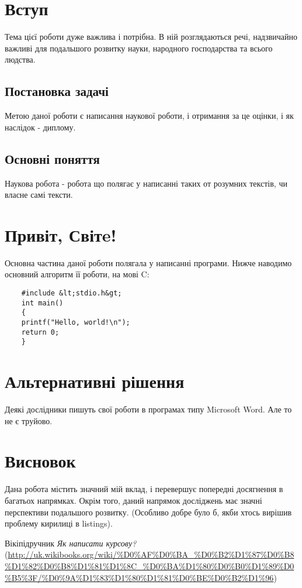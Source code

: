 \documentclass[a4paper,14pt]{extreport}
\begin{document}
	\tableofcontents
	\newpage
	
	\chapter{Вступ} 
	Тема цієї роботи дуже важлива і потрібна. В ній розглядаються речі, надзвичайно
	важливі для подальшого розвитку науки, народного господарства та всього людства.

	\section{Постановка задачі} 
	Метою даної роботи є написання наукової роботи, і отримання за це оцінки, і як
	наслідок - диплому.
	
	\section{Основні поняття}
	Наукова робота - робота що полягає у написанні таких от розумних текстів, чи власне самі тексти.
	
	\chapter{Привіт, Світe!} 
	Основна частина даної роботи полягала у написанні програми. Нижче наводимо основний алгоритм її роботи, на мові C:
	
	\begin{lstlisting}
	#include &lt;stdio.h&gt;
	int main() 
	{ 
	printf("Hello, world!\n"); 
	return 0; 
	} 
	\end{lstlisting}


	\chapter{Альтернативні рішення} 
	Деякі дослідники пишуть свої роботи в програмах типу Microsoft Word. Але то не є труйово\cite{howto}.
	
	\chapter{Висновок} 
	Дана робота містить значний мій вклад, і перевершує попередні досягнення в багатьох напрямках. Окрім того, даний напрямок досліджень має значні перспективи
	подальшого розвитку. (Особливо добре було б, якби хтось вирішив проблему кирилиці в listings).
	
	\newpage
	\begin{thebibliography}{9}
		
		 Вікіпідручник \emph{Як написати курсову?}
		(\url{http://uk.wikibooks.org/wiki/%D0%AF%D0%BA_%D0%B2%D1%87%D0%B8%D1%82%D0%B8%D1%81%D1%8C_%D0%BA%D1%80%D0%B0%D1%89%D0%B5%3F/%D0%9A%D1%83%D1%80%D1%81%D0%BE%D0%B2%D1%96})
			
	\end{thebibliography}
		
\end{document}
